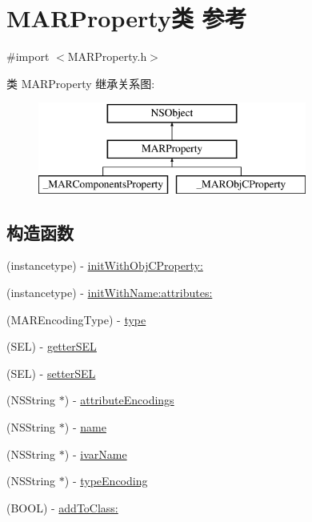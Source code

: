 \hypertarget{interface_m_a_r_property}{}\section{M\+A\+R\+Property类 参考}
\label{interface_m_a_r_property}


{\ttfamily \#import $<$M\+A\+R\+Property.\+h$>$}

类 M\+A\+R\+Property 继承关系图\+:\begin{figure}[H]
\begin{center}
\leavevmode
\includegraphics[height=3.000000cm]{interface_m_a_r_property}
\end{center}
\end{figure}
\subsection*{构造函数}
\begin{DoxyCompactItemize}
\item 
(instancetype) -\/ \hyperlink{interface_m_a_r_property_a568413fa1d786cb401adbb22a264b04d}{init\+With\+Obj\+C\+Property\+:}
\item 
(instancetype) -\/ \hyperlink{interface_m_a_r_property_a416274a9ab704d941cd3f8197d9c0609}{init\+With\+Name\+:attributes\+:}
\item 
(M\+A\+R\+Encoding\+Type) -\/ \hyperlink{interface_m_a_r_property_a577fc2e87b80221d05c18b6f41b92643}{type}
\item 
(S\+EL) -\/ \hyperlink{interface_m_a_r_property_a729de14e7703def75d9cf4d632e801e2}{getter\+S\+EL}
\item 
(S\+EL) -\/ \hyperlink{interface_m_a_r_property_aac61fef11e5a4e2d14a8bb517ba53666}{setter\+S\+EL}
\item 
(N\+S\+String $\ast$) -\/ \hyperlink{interface_m_a_r_property_a132d5700e141118918fb049deaf1673d}{attribute\+Encodings}
\item 
(N\+S\+String $\ast$) -\/ \hyperlink{interface_m_a_r_property_a1ee68bcd7917d7a0c991784f011b1476}{name}
\item 
(N\+S\+String $\ast$) -\/ \hyperlink{interface_m_a_r_property_a41b6de373b3c625532094586dd93d01c}{ivar\+Name}
\item 
(N\+S\+String $\ast$) -\/ \hyperlink{interface_m_a_r_property_a65951e9300a6499c06ad33867773b8d7}{type\+Encoding}
\item 
(B\+O\+OL) -\/ \hyperlink{interface_m_a_r_property_a820be7200a12cbb0dde67453030a6f90}{add\+To\+Class\+:}
\end{DoxyCompactItemize}
